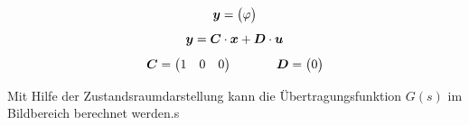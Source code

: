 \begin{equation}
\boldsymbol{y} = \begin{pmatrix}
\varphi
\end{pmatrix}
\end{equation}
\begin{equation}
\boldsymbol{y} = \boldsymbol{C} \cdot \boldsymbol{x} + \boldsymbol{D} \cdot \boldsymbol{u}
\end{equation}
\begin{equation}
\boldsymbol{C} = \begin{pmatrix}
1 & 0 & 0 
\end{pmatrix}
\hspace{35pt}
\boldsymbol{D} = \begin{pmatrix}
0
\end{pmatrix}
\end{equation}

Mit Hilfe der Zustandsraumdarstellung kann die Übertragungsfunktion $G(s)$ im Bildbereich berechnet werden.s